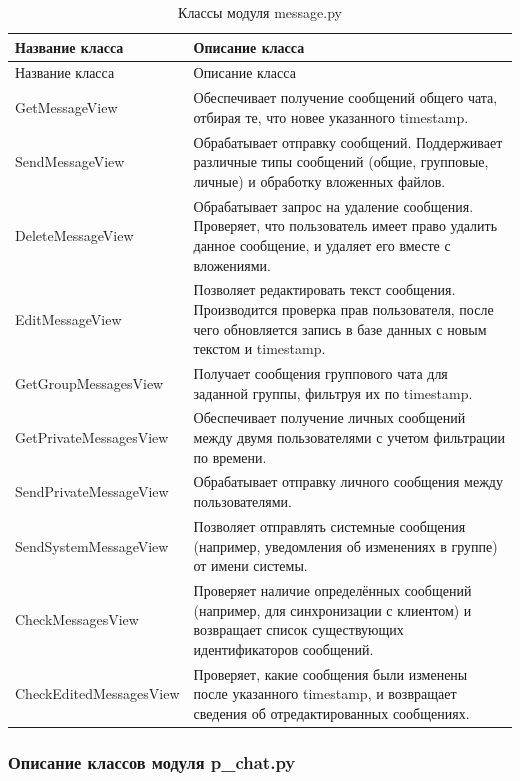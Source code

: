 \begin{xltabular}{\textwidth}{|l|X|}
	\caption{Классы модуля message.py} \label{tab:message_classes} \\ \hline
	Название класса & Описание класса \\ \hline
	\endfirsthead
	Название класса & Описание класса \\ \hline
	\finishhead
	GetMessageView & Обеспечивает получение сообщений общего чата, отбирая те, что новее указанного timestamp. \\ \hline
	SendMessageView & Обрабатывает отправку сообщений. Поддерживает различные типы сообщений (общие, групповые, личные) и обработку вложенных файлов. \\ \hline
	DeleteMessageView & Обрабатывает запрос на удаление сообщения. Проверяет, что пользователь имеет право удалить данное сообщение, и удаляет его вместе с вложениями. \\ \hline
	EditMessageView & Позволяет редактировать текст сообщения. Производится проверка прав пользователя, после чего обновляется запись в базе данных с новым текстом и timestamp. \\ \hline
	GetGroupMessagesView & Получает сообщения группового чата для заданной группы, фильтруя их по timestamp. \\ \hline
	GetPrivateMessagesView & Обеспечивает получение личных сообщений между двумя пользователями с учетом фильтрации по времени. \\ \hline
	SendPrivateMessageView & Обрабатывает отправку личного сообщения между пользователями. \\ \hline
	SendSystemMessageView & Позволяет отправлять системные сообщения (например, уведомления об изменениях в группе) от имени системы. \\ \hline
	CheckMessagesView & Проверяет наличие определённых сообщений (например, для синхронизации с клиентом) и возвращает список существующих идентификаторов сообщений. \\ \hline
	CheckEditedMessagesView & Проверяет, какие сообщения были изменены после указанного timestamp, и возвращает сведения об отредактированных сообщениях. \\ \hline
\end{xltabular}

\subsubsection{Описание классов модуля p\_chat.py}

